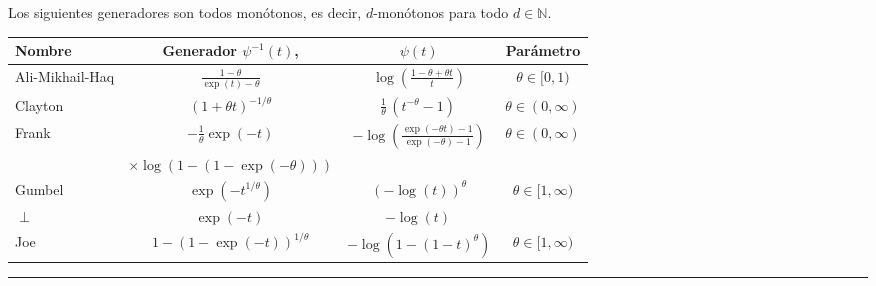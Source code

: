 \begin{f}[Cópula]
	Los siguientes generadores son todos monótonos, es decir, \(d\)-monótonos para todo \(d\in\mathbb{N}\).
	
	\footnotesize
	\renewcommand\arraystretch{1.3}
	\begin{tabular}{|m{10mm}|ccc|}    \rowcolor{BleuProfondIRA!40} 
		\hline
		Nombre         & Generador \(\psi^{-1}(t)\),     & \(\psi(t)\) &    Parámetro\\
	\hline
	Ali-Mikhail-Haq 	&\(\frac{1-\theta}{\exp(t)-\theta} \)	
	&\(\log\left(\frac{1-\theta+\theta t}{t}\right)\) 	
	&\(\theta\in[0,1)\)\\
	Clayton		&\(\left(1+\theta t\right)^{-1/\theta} 	\)
	&\(\frac1\theta\,(t^{-\theta}-1)\, 	\)
	&\(\theta\in(0,\infty)\)\\
	Frank 		&\(-\frac{1}{\theta}\exp(-t)\)
	&\(-\log\left(\frac{\exp(-\theta t)-1}{\exp(-\theta)-1}\right)\)
	&\(\theta\in(0,\infty)\)\\
	&\(\times\log(1-(1-\exp(-\theta)))\)
	&
	&\\
	Gumbel 		&\(\exp\left(-t^{1/\theta}\right) \)	
	&\(\left(-\log(t)\right)^\theta\)	
	&\(\theta\in[1,\infty)\)\\
	\(\perp\) 	&\(\exp(-t)\,\)
	&\(-\log(t)\,\) 	
	& \\
	Joe		&\(1-\left(1-\exp(-t)\right)^{1/\theta}\)
	&\(-\log\left(1-(1-t)^\theta\right)\)
	&\(\theta\in[1,\infty)\)\\
	\hline
\end{tabular}
\renewcommand\arraystretch{1}
\end{f}
\hrule

